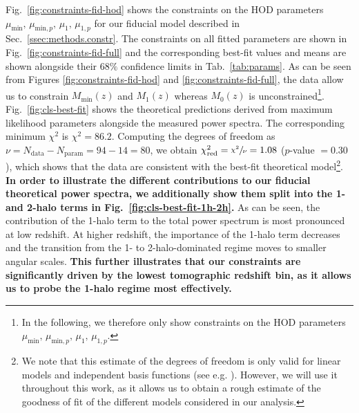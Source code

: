 \documentclass[a4paper,11pt]{article}
\newcommand{\rev}[1]{{\textbf{#1}}}
\begin{document}
      Fig.~\ref{fig:constraints-fid-hod} shows the constraints on the HOD parameters $\mu_{\mathrm{min}}, \allowbreak \, \mu_{\mathrm{min}, p}, \allowbreak \, \mu_{1}, \allowbreak \, \mu_{1, p}$ for our fiducial model described in Sec.~\ref{ssec:methods.constr}. The constraints on all fitted parameters are shown in Fig.~\ref{fig:constraints-fid-full} and the corresponding best-fit values and means are shown alongside their $68 \%$ confidence limits in Tab.~\ref{tab:params}. As can be seen from Figures \ref{fig:constraints-fid-hod} and \ref{fig:constraints-fid-full}, the data allow us to constrain $M_{\mathrm{min}}(z)$ and $M_{1}(z)$ whereas $M_{0}(z)$ is unconstrained\footnote{In the following, we therefore only show constraints on the HOD parameters $\mu_{\mathrm{min}}, \, \mu_{\mathrm{min}, p}, \, \mu_{1}, \, \mu_{1, p}$.}. Fig.~\ref{fig:cls-best-fit} shows the theoretical predictions derived from maximum likelihood parameters alongside the measured power spectra. The corresponding minimum $\chi^{2}$ is $\chi^{2} = 86.2$. Computing the degrees of freedom as $\nu = N_{\mathrm{data}} - N_{\mathrm{param}} = 94 - 14 = 80$, we obtain $\chi^{2}_{\mathrm{red}} = \sfrac{\chi^{2}}{\nu} = 1.08$ ($p$-value $= 0.30$), which shows that the data are consistent with the best-fit theoretical model\footnote{We note that this estimate of the degrees of freedom is only valid for linear models and independent basis functions (see e.g. \cite{Andrae:2010}). However, we will use it throughout this work, as it allows us to obtain a rough estimate of the goodness of fit of the different models considered in our analysis.}. \rev{In order to illustrate the different contributions to our fiducial theoretical power spectra, we additionally show them split into the 1- and 2-halo terms in Fig.~\ref{fig:cls-best-fit-1h-2h}.} As can be seen, the contribution of the 1-halo term to the total power spectrum is most pronounced at low redshift. At higher redshift, the importance of the 1-halo term decreases and the transition from the 1- to 2-halo-dominated regime moves to smaller angular scales. \rev{This further illustrates that our constraints are significantly driven by the lowest tomographic redshift bin, as it allows us to probe the 1-halo regime most effectively.}
\end{document}
